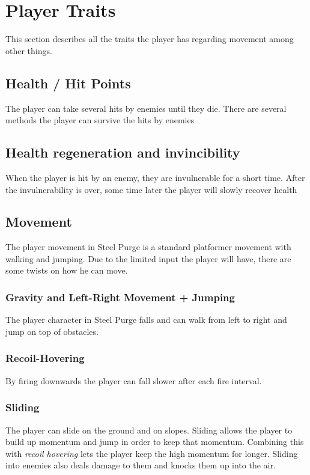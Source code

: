 \documentclass[../Main.tex]{subfiles}
\begin{document}
\section{Player Traits}

This section describes all the traits the player has regarding movement among other things.

\subsection{Health / Hit Points}

The player can take several hits by enemies until they die. There are several methods the player can survive the hits by enemies

\subsection{Health regeneration and invincibility}

When the player is hit by an enemy, they are invulnerable for a short time. After the invulnerability is over, some time later the player will slowly recover health

\subsection{Movement}

The player movement in Steel Purge is a standard platformer movement with walking and jumping. Due to the limited input the player will have, there are some twists on how he can move.

\subsubsection{Gravity and Left-Right Movement + Jumping}

The player character in Steel Purge falls and can walk from left to right and jump on top of obstacles.

\subsubsection{Recoil-Hovering}

By firing downwards the player can fall slower after each fire interval.

\subsubsection{Sliding}

The player can slide on the ground and on slopes. Sliding allows the player to build up momentum and jump in order to keep that momentum. Combining this with \emph{recoil hovering} lets the player keep the high momentum for longer. Sliding into enemies also deals damage to them and knocks them up into the air. 
\end{document}
